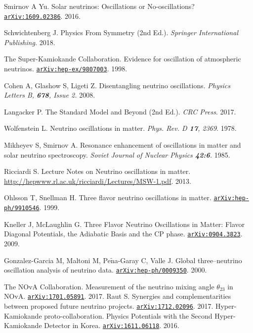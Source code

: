 \begin{thebibliography}{100}
	 Smirnov A Yu. Solar neutrinos: Oscillations or
		No-oscillations?
		\href{https://arxiv.org/abs/1609.02386}{\texttt{arXiv:1609.02386}}. 2016.



		

	 Schwichtenberg J. Physics From Symmetry (2nd Ed.).
		\textit{Springer International Publishing.} 2018.

	 The Super-Kamiokande Collaboration. Evidence for oscillation
		of atmospheric neutrinos.
		\href{https://arxiv.org/abs/hep-ex/9807003}{\texttt{arXiv:hep-ex/9807003}}. 1998.

	 Cohen A, Glashow S, Ligeti Z. Disentangling neutrino
		oscillations. \textit{Physics Letters B, \textbf{678}, Issue 2.} 2008.

	 Langacker P. The Standard Model and Beyond (2nd Ed.).
		\textit{CRC Press}. 2017.

	 Wolfenstein L. Neutrino oscillations in matter.
		\textit{Phys. Rev. D \textbf{17}, 2369}. 1978.

	 Mikheyev S, Smirnov A. Resonance enhancement of
		oscillations in matter and solar neutrino spectroscopy. \textit{Soviet
		Journal of Nuclear Physics \textbf{42:6}.} 1985.

	 Ricciardi S. Lecture Notes on Neutrino oscillations in
		matter.
		\url{http://hepwww.rl.ac.uk/ricciardi/Lectures/MSW-1.pdf}. 2013.

	 Ohlsson T, Snellman H. Three flavor neutrino oscillations
		in matter.
		\href{https://arxiv.org/abs/hep-ph/9910546v4}{\texttt{arXiv:hep-ph/9910546}}. 1999.

	 Kneller J, McLaughlin G. Three Flavor Neutrino Oscillations
		in Matter: Flavor Diagonal Potentials, the Adiabatic Basis and the CP
		phase. \href{https://arxiv.org/abs/0904.3823}{\texttt{arXiv:0904.3823}}. 2009.

	 Gonzalez-Garcia M, Maltoni M, Pe$\tilde{\text{n}}$a-Garay C,
		Valle J. Global three–neutrino oscillation analysis of
		neutrino data.
		\href{https://arxiv.org/abs/hep-ph/0009350}{\texttt{arXiv:hep-ph/0009350}}.
		2000.


	 The NOvA Collaboration. Measurement of the neutrino mixing
		angle $\theta_{23}$ in NOvA.
		\href{https://arxiv.org/abs/1701.05891}{\texttt{arXiv:1701.05891}}. 2017.
	 Raut S. Synergies and complementarities between proposed
		future neutrino projects.
		\href{https://arxiv.org/abs/1712.02096v1}{\texttt{arXiv:1712.02096}}.
		2017.
	 Hyper-Kamiokande proto-collaboration. Physics Potentials with
		the Second Hyper-Kamiokande Detector in Korea.
		\href{https://arxiv.org/abs/1611.06118}{\texttt{arXiv:1611.06118}}. 2016.


\end{thebibliography}
